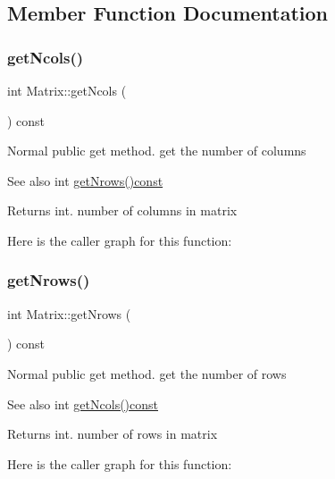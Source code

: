 \subsection{Member Function Documentation}
\mbox{\label{class_matrix_ae0a5f2154953b8d129a90b04f91d9079}} 
\subsubsection{\texorpdfstring{get\+Ncols()}{getNcols()}}
{\footnotesize\ttfamily int Matrix\+::get\+Ncols (\begin{DoxyParamCaption}{ }\end{DoxyParamCaption}) const}

Normal public get method. get the number of columns \begin{DoxySeeAlso}{See also}
int \mbox{\hyperlink{class_matrix_a711f84a1c62832d9d197d78c9855a276}{get\+Nrows()const}} 
\end{DoxySeeAlso}
\begin{DoxyReturn}{Returns}
int. number of columns in matrix 
\end{DoxyReturn}
Here is the caller graph for this function\+:
\mbox{\label{class_matrix_a711f84a1c62832d9d197d78c9855a276}} 
\subsubsection{\texorpdfstring{get\+Nrows()}{getNrows()}}
{\footnotesize\ttfamily int Matrix\+::get\+Nrows (\begin{DoxyParamCaption}{ }\end{DoxyParamCaption}) const}

Normal public get method. get the number of rows \begin{DoxySeeAlso}{See also}
int \mbox{\hyperlink{class_matrix_ae0a5f2154953b8d129a90b04f91d9079}{get\+Ncols()const}} 
\end{DoxySeeAlso}
\begin{DoxyReturn}{Returns}
int. number of rows in matrix 
\end{DoxyReturn}
Here is the caller graph for this function\+:
\mbox{\label{class_matrix_af4d468252f3ecbbcaa5726c76e332b4c}} 
